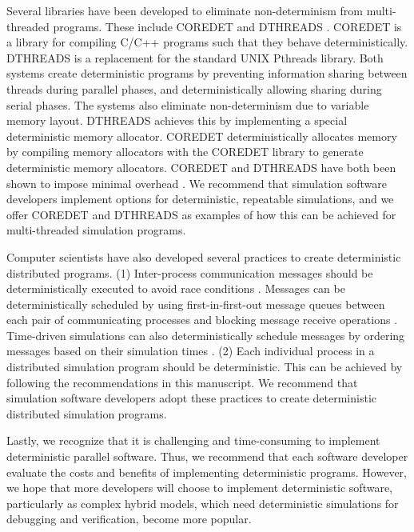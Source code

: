 \documentclass[journal,transmag,twoside]{IEEEtran}
\begin{document}
Several libraries have been developed to eliminate non-determinism from multi-threaded programs. These include C{\small ORE}D{\small ET} \cite{bergan2010coredet} and D{\small THREADS} \cite{liu2011dthreads}.
C{\small ORE}D{\small ET} is a library for compiling C/C++ programs such that they behave deterministically.
D{\small THREADS} is a replacement for the standard UNIX Pthreads library.
Both systems create deterministic programs by preventing information sharing between
threads during parallel phases, and deterministically allowing sharing during serial phases.
The systems also eliminate non-determinism due to variable memory layout. D{\small THREADS} achieves this by implementing a special deterministic memory allocator. 
C{\small ORE}D{\small ET} deterministically allocates memory by compiling memory allocators with the C{\small ORE}D{\small ET} library to generate deterministic memory allocators.
C{\small ORE}D{\small ET} and D{\small THREADS} have both been shown to impose minimal overhead \cite{liu2011dthreads}. We recommend that simulation software developers implement options for deterministic, repeatable simulations, and we offer C{\small ORE}D{\small ET} and D{\small THREADS} as examples of how this can be achieved for multi-threaded simulation programs.

Computer scientists have also developed several practices to create deterministic distributed programs. (1) Inter-process communication messages should be deterministically executed to avoid race conditions \cite{netzer1992race}. Messages can be deterministically scheduled by using first-in-first-out message queues between each pair of communicating processes and blocking message receive operations \cite{chandy1981asynchronous}. Time-driven simulations can also deterministically schedule messages by ordering messages based on their simulation times \cite{Jefferson1985}. (2) Each individual process in a distributed simulation program should be deterministic. This can be achieved by following the recommendations in this manuscript. We recommend that simulation software developers adopt these practices to create deterministic distributed simulation programs.

Lastly, we recognize that it is challenging and time-consuming to implement deterministic parallel software. Thus, we recommend that each software developer evaluate the costs and benefits of implementing deterministic programs. However, we hope that more developers will choose to implement deterministic software, particularly as complex hybrid models, which need deterministic simulations for debugging and verification, become more popular.
\end{document}
